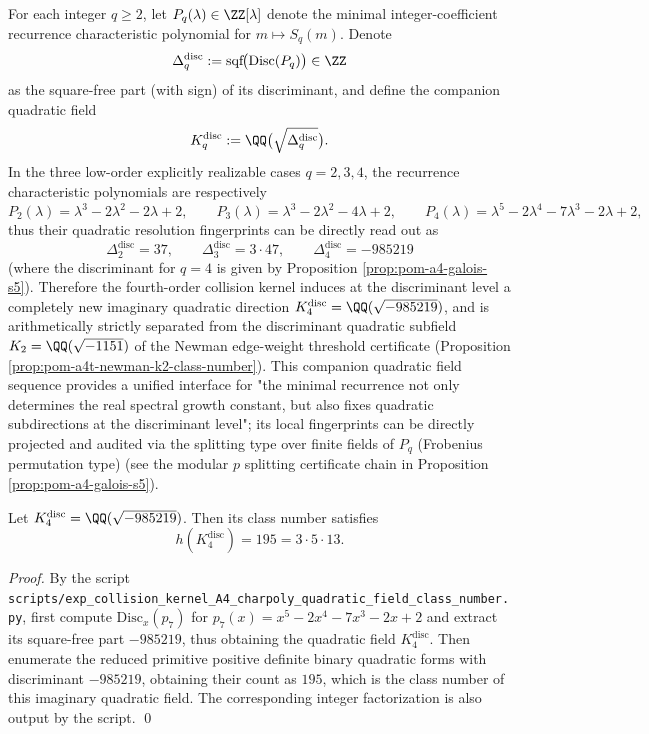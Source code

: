 \begin{remark}\label{rem:pom-discriminant-quadratic-field-tower}
For each integer \(q\ge 2\), let \(P_q(\lambda)\in\ZZ[\lambda]\) denote the minimal integer-coefficient recurrence characteristic polynomial for \(m\mapsto S_q(m)\).
Denote
\[
\Delta_q^{\mathrm{disc}}:=\mathrm{sqf}\!\bigl(\mathrm{Disc}(P_q)\bigr)\in\ZZ
\]
as the square-free part (with sign) of its discriminant, and define the companion quadratic field
\[
K_q^{\mathrm{disc}}:=\QQ\bigl(\sqrt{\Delta_q^{\mathrm{disc}}}\bigr).
\]
In the three low-order explicitly realizable cases \(q=2,3,4\), the recurrence characteristic polynomials are respectively
\[
P_2(\lambda)=\lambda^3-2\lambda^2-2\lambda+2,\qquad
P_3(\lambda)=\lambda^3-2\lambda^2-4\lambda+2,\qquad
P_4(\lambda)=\lambda^5-2\lambda^4-7\lambda^3-2\lambda+2,
\]
thus their quadratic resolution fingerprints can be directly read out as
\[
\Delta_2^{\mathrm{disc}}=37,\qquad
\Delta_3^{\mathrm{disc}}=3\cdot 47,\qquad
\Delta_4^{\mathrm{disc}}=-985219
\]
(where the discriminant for \(q=4\) is given by Proposition \ref{prop:pom-a4-galois-s5}).
Therefore the fourth-order collision kernel induces at the discriminant level a completely new imaginary quadratic direction
\(
K_4^{\mathrm{disc}}=\QQ(\sqrt{-985219})
\),
and is arithmetically strictly separated from the discriminant quadratic subfield \(K_2=\QQ(\sqrt{-1151})\) of the Newman edge-weight threshold certificate (Proposition \ref{prop:pom-a4t-newman-k2-class-number}).
This companion quadratic field sequence provides a unified interface for "the minimal recurrence not only determines the real spectral growth constant, but also fixes quadratic subdirections at the discriminant level"; its local fingerprints can be directly projected and audited via the splitting type over finite fields of \(P_q\) (Frobenius permutation type) (see the modular \(p\) splitting certificate chain in Proposition \ref{prop:pom-a4-galois-s5}).
\end{remark}
\begin{proposition}[\texorpdfstring{$K_4^{\mathrm{disc}}=\QQ(\sqrt{-985219})$}{K4disc} Class Number Certificate: \(h=195\)]\label{prop:pom-a4-disc-quadratic-class-number}
Let \(K_4^{\mathrm{disc}}=\QQ(\sqrt{-985219})\).
Then its class number satisfies
\[
h(K_4^{\mathrm{disc}})=195=3\cdot 5\cdot 13.
\]
\end{proposition}
\begin{proof}
By the script \texttt{scripts/exp\_collision\_kernel\_A4\_charpoly\_quadratic\_field\_class\_number.py},
first compute \(\mathrm{Disc}_x(p_7)\) for \(p_7(x)=x^5-2x^4-7x^3-2x+2\) and extract its square-free part \(-985219\), thus obtaining the quadratic field \(K_4^{\mathrm{disc}}\).
Then enumerate the reduced primitive positive definite binary quadratic forms with discriminant \(-985219\), obtaining their count as \(195\), which is the class number of this imaginary quadratic field.
The corresponding integer factorization is also output by the script. \qed
\end{proof}


